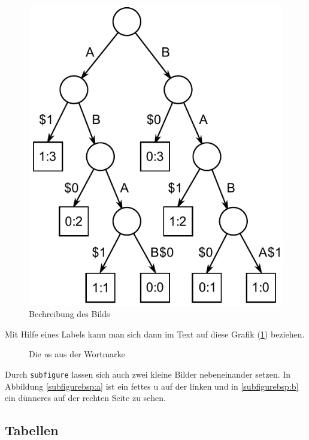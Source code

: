 \begin{figure}[ht]
    \centering
    \includegraphics[width=.4\textwidth]{images/Suffix_tree_ABAB_BABA}
    \caption{\label{anker}Bechreibung des Bilds}
\end{figure}

Mit Hilfe eines Labels kann man sich dann im Text auf diese Grafik (\ref{anker}) beziehen. 

\begin{figure}[ht]
    \centering
    \hspace{1cm}
    \caption{Die \emph{u}s aus der Wortmarke}
\end{figure}

Durch \verb|subfigure| lassen sich auch zwei kleine Bilder nebeneinander setzen. In Abbildung \ref{subfigurebsp:a} ist ein fettes u auf der linken und in \ref{subfigurebsp:b} ein dünneres auf der rechten Seite zu sehen.


\subsection{Tabellen}

